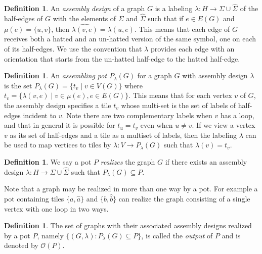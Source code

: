 \documentclass{elsarticle}
\theoremstyle{definition}
\newtheorem{definition}[theorem]{Definition}
\theoremstyle{remark}
\theoremstyle{plain}
\theoremstyle{plain}
\begin{document}
\begin{definition} An \textit{assembly design} of a graph $G$ is a labeling $\lambda : H \rightarrow \Sigma \cup \hat{\Sigma}$ of the half-edges of $G$ with the elements of $\Sigma$ and $\hat{\Sigma}$ such that if $e \in E(G)$ and $\mu(e) = \{u,v\}$, then $\widehat{\lambda(v,e)} = \lambda(u,e)$. This means that each edge of $G$ receives both a hatted and an un-hatted version  of the same symbol, one on each of its half-edges. We use the convention that $\lambda$ provides each edge with an orientation that starts from the un-hatted half-edge to the hatted half-edge.  \end{definition}

\begin{definition} An \emph{assembling pot $P_{\lambda}(G)$} for a graph $G$ with assembly design $\lambda$ is the set $P_{\lambda}(G) = \{t_v \mid v \in V(G)\}$ where $t_v =\{ \lambda (v,e) \mid v \in \mu(e), e \in E(G)\}$. This means that for each vertex $v$ of $G$, the assembly design specifies a tile $t_v$ whose multi-set is the set of labels of half-edges incident to $v$. Note there are two complementary labels when $v$ has a loop, and that in general it is possible for $t_u = t_v$ even when $u \neq v$.  If we view a vertex $v$ as its set of half-edges and a tile as a multiset of labels, then the labeling $\lambda$ can be used to map vertices to tiles by $\lambda : V \rightarrow P_{\lambda}(G)$ such that $\lambda(v) = t_v$. \end{definition}

\begin{definition} We say a pot $P$ \textit{realizes} the graph $G$ if there exists an assembly design $\lambda : H \rightarrow \Sigma \cup \hat{\Sigma}$ such that $P_{\lambda}(G) \subseteq P$. \end{definition} Note that a graph may be realized in more than one way by a pot. For example a pot containing tiles $\{a, \hat{a}\}$ and $\{b, \hat{b}\}$ can realize the graph consisting of a single vertex with one loop in two ways.

\begin{definition} The set of graphs with their associated assembly designs realized by a pot $P$, namely $\{(G,\lambda): P_{\lambda}(G) \subseteq P \}$, is called the \textit{output} of $P$ and is denoted by $\mathcal{O}(P)$. \end{definition}
\end{document}
